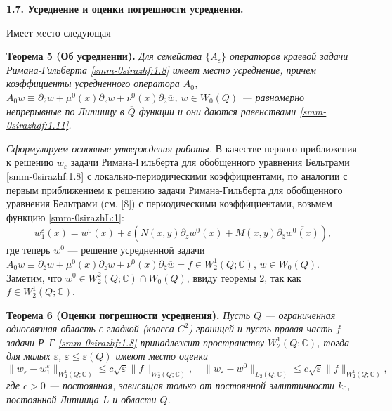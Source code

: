 \documentclass[a4paper,12pt]{article}
\theoremstyle{definition}
\begin{document}
\smallskip
\textbf{1.7. Усреднение и оценки погрешности усреднения.}

Имеет место  следующая

\smallskip
\textbf{Теорема 5 (Об усреднении).} {\it Для семейства $\{A_\varepsilon\}$ операторов краевой
	задачи Римана-Гильберта \eqref{smm-0sirazhf:1.8} имеет место усреднение, причем коэффициенты
	усредненного оператора $A_0$, $A_0w\equiv\partial_{\overline{z}}w+\mu^0(x)\partial_zw+\nu^0(x)\partial_{\overline{z}}
	\overline w$, $w\in W_0(Q)$ --- равномерно непрерывные  по Липшицу в $\overline{Q}$ функции и они даются равенствами \eqref{smm-0sirazhdf:1.11}.}


\smallskip
\textit{Сформулируем основные утверждения работы.} В качестве первого приближения к решению $w_\varepsilon$  задачи
Римана-Гильберта  для обобщенного уравнения Бельтрами \eqref{smm-0sirazhf:1.8} с локально-периодическими коэффициентами, по аналогии с первым приближением к решению  задачи Римана-Гильберта для обобщенного уравнения Бельтрами (см. [8]) с периодическими коэффициентами, возьмем функцию \eqref{smm-0sirazhL:1}:
$$ w_1^\varepsilon(x)=w^0(x)+\varepsilon\left(N(x,y)\partial_zw^0(x)+M(x,y)\partial_{\bar{z}}\overline{w^0(x)}\right),$$ где теперь $w^0$ --- решение усредненной задачи $A_0w\equiv\partial_{\overline{z}}w+\mu^0(x)\partial_zw+\nu^0(x)\partial_{\overline{z}}
\overline{w}=f\in W_2^1(Q;\mathbb{C})$, $w\in W_0(Q)$. Заметим, что $w^0\in W_2^2(Q;\mathbb{C})\cap W_0(Q)$, ввиду
теоремы 2, так как $f\in W_2^1(Q;\mathbb{C})$.

\smallskip
\textbf{Теорема 6 (Оценки погрешности усреднения).}
{\it Пусть $Q$ --- ограниченная односвязная область с гладкой (класса $C^2$) границей и пусть правая часть $f$ задачи Р--Г \eqref{smm-0sirazhf:1.8} принадлежит пространству $W_2^1(Q;\mathbb{C})$, тогда для малых $\varepsilon$, $\varepsilon\leqslant \varepsilon(Q)$ имеют место оценки
	\begin{equation}\label{smm-0sirazhT6:1}
		\|w_\varepsilon-w_1^\varepsilon\|_{W_2^1 (Q; \mathbb{C})}\leqslant c\sqrt{\varepsilon}\|f
		\|_{W^1_2 (Q; \mathbb{C})}, \quad \|w_\varepsilon-w^0\|_{L_2 (Q; \mathbb{C})}\leqslant c\sqrt{\varepsilon}\|f
		\|_{W_2^1 (Q; \mathbb{C})},
	\end{equation}
	где $c>0$ --- постоянная, зависящая только от постоянной эллиптичности $k_0$,  постоянной Липшица $L$ и области $Q$.}
\end{document}
